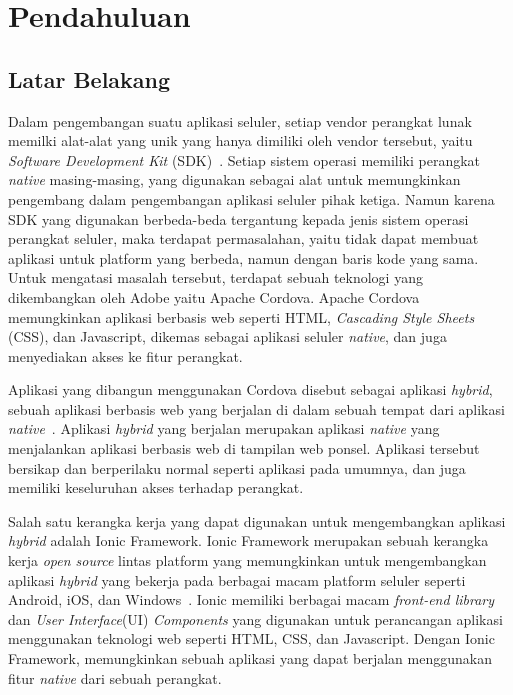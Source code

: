 \chapter{Pendahuluan}
\label{chap:intro}
   
\section{Latar Belakang}
\label{sec:label}

Dalam pengembangan suatu aplikasi seluler, setiap vendor perangkat lunak memilki alat-alat yang unik yang hanya dimiliki oleh vendor tersebut, yaitu \textit{Software Development Kit} (SDK)~\cite{yusuf:16:ionic}. Setiap sistem operasi memiliki perangkat \textit{native} masing-masing, yang digunakan sebagai alat untuk memungkinkan pengembang dalam pengembangan aplikasi seluler pihak ketiga. Namun karena SDK yang digunakan berbeda-beda tergantung kepada jenis sistem operasi perangkat seluler, maka terdapat permasalahan, yaitu tidak dapat membuat aplikasi untuk platform yang berbeda, namun dengan baris kode yang sama. Untuk mengatasi masalah tersebut, terdapat sebuah teknologi yang dikembangkan oleh Adobe yaitu Apache Cordova. Apache Cordova memungkinkan aplikasi berbasis web seperti HTML, {\it Cascading Style Sheets} (CSS), dan Javascript, dikemas sebagai aplikasi seluler \textit{native}, dan juga menyediakan akses ke fitur perangkat.

Aplikasi yang dibangun menggunakan Cordova disebut sebagai aplikasi \textit{hybrid}, sebuah aplikasi berbasis web yang berjalan di dalam sebuah tempat dari aplikasi \textit{native}~\cite{yusuf:16:ionic}. Aplikasi \textit{hybrid} yang berjalan merupakan aplikasi \textit{native} yang menjalankan aplikasi berbasis web di tampilan web ponsel. Aplikasi tersebut bersikap dan berperilaku normal seperti aplikasi pada umumnya, dan juga memiliki keseluruhan akses terhadap perangkat. 

Salah satu kerangka kerja yang dapat digunakan untuk mengembangkan aplikasi \textit{hybrid} adalah Ionic Framework. Ionic Framework merupakan sebuah kerangka kerja {\it open source} lintas platform yang memungkinkan untuk mengembangkan aplikasi \textit{hybrid} yang bekerja pada berbagai macam platform seluler seperti Android, iOS, dan Windows~\cite{waranashiwar:18:ionic}. Ionic memiliki berbagai macam \textit{front-end library} dan \textit{User Interface}(UI) {\it Components} yang digunakan untuk  perancangan aplikasi menggunakan teknologi web seperti HTML, CSS, dan Javascript. Dengan Ionic Framework, memungkinkan sebuah aplikasi yang dapat berjalan menggunakan fitur \textit{native} dari sebuah perangkat.

